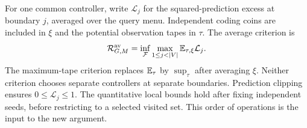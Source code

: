 \documentclass[11pt]{amsart}
\theoremstyle{definition}\newtheorem{definition}[theorem]{Definition}
\theoremstyle{remark}\newtheorem{remark}[theorem]{Remark}
\begin{document}
For one common controller, write $\mathcal L_j$ for the squared-prediction excess at boundary $j$, averaged over the query menu. Independent coding coins are included in $\xi$ and the potential observation tapes in $\tau$. The average criterion is
\[
 \mathcal R^{\mathrm{av}}_{G,M}
   =\inf_{\mathcal F}\max_{1\le j<|V|}
                         \E_{\tau,\xi}\mathcal L_j.
\]
The maximum-tape criterion replaces $\mathbb E_\tau$ by $\sup_\tau$ after averaging $\xi$. Neither criterion chooses separate controllers at separate boundaries. Prediction clipping ensures $0\le\mathcal L_j\le1$. The quantitative local bounds hold after fixing independent seeds, before restricting to a selected visited set. This order of operations is the input to the new argument.





\appendix
\end{document}
